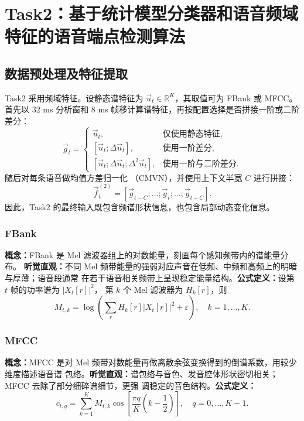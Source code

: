 \documentclass[a4paper]{article}
\begin{document}
\section{Task2：基于统计模型分类器和语音频域特征的语音端点检测算法}

\subsection{数据预处理及特征提取}

Task2 采用频域特征。设静态谱特征为 $\vec{u}_t \in \mathbb{R}^{K}$，其取值可为 FBank 或 MFCC。
首先以 $32$ ms 分析窗和 $8$ ms 帧移计算谱特征，再按配置选择是否拼接一阶或二阶差分：
\begin{equation}
  \vec{g}_t =
  \begin{cases}
    \vec{u}_t, & \text{仅使用静态特征},\\
    [\vec{u}_t;\Delta \vec{u}_t], & \text{使用一阶差分},\\
    [\vec{u}_t;\Delta \vec{u}_t;\Delta^2 \vec{u}_t], & \text{使用一阶与二阶差分}.
  \end{cases}
\end{equation}
随后对每条语音做均值方差归一化
（CMVN），并使用上下文半宽 $C$ 进行拼接：
\begin{equation}
  \vec{f}_t^{(2)} = [\vec{g}_{t-C};\dots;\vec{g}_{t};\dots;\vec{g}_{t+C}].
\end{equation}
因此，Task2 的最终输入既包含频谱形状信息，也包含局部动态变化信息。

\subsubsection{FBank}

\textbf{概念：}FBank 是 Mel 滤波器组上的对数能量，刻画每个感知频带内的谱能量分布。
\textbf{听觉直观：}不同 Mel 频带能量的强弱对应声音在低频、中频和高频上的明暗与厚薄；语音段通常
在若干语音相关频带上呈现稳定能量结构。\textbf{公式定义：}设第 $t$ 帧的功率谱为 $|X_t[r]|^2$，
第 $k$ 个 Mel 滤波器为 $H_k[r]$，则
\begin{equation}
  M_{t,k} = \log \left( \sum_r H_k[r]|X_t[r]|^2 + \varepsilon \right),
  \quad k=1,\dots,K.
\end{equation}

\subsubsection{MFCC}

\textbf{概念：}MFCC 是对 Mel 频带对数能量再做离散余弦变换得到的倒谱系数，用较少维度描述语音谱
包络。\textbf{听觉直观：}谱包络与音色、发音腔体形状密切相关；MFCC 去除了部分细碎谱细节，更强
调稳定的音色结构。\textbf{公式定义：}
\begin{equation}
  c_{t,q} = \sum_{k=1}^{K} M_{t,k}
  \cos\left[\frac{\pi q}{K}\left(k-\frac{1}{2}\right)\right],
  \quad q=0,\dots,K-1.
\end{equation}
\end{document}

